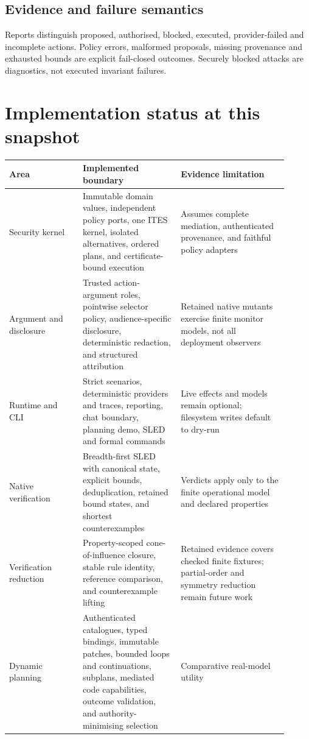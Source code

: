 \documentclass[11pt]{article}
\begin{document}
\subsection{Evidence and failure semantics}
Reports distinguish proposed, authorised, blocked, executed, provider-failed
and incomplete actions. Policy errors, malformed proposals, missing provenance
and exhausted bounds are explicit fail-closed outcomes. Securely blocked
attacks are diagnostics, not executed invariant failures.

\section{Implementation status at this snapshot}

\begin{tabular}{p{0.24\linewidth}p{0.32\linewidth}p{0.35\linewidth}}
\toprule
Area & Implemented boundary & Evidence limitation \\
\midrule
Security kernel & Immutable domain values, independent policy ports, one ITES
kernel, isolated alternatives, ordered plans, and certificate-bound execution
& Assumes complete mediation, authenticated provenance, and faithful policy
adapters \\
Argument and disclosure & Trusted action-argument roles, pointwise selector
policy, audience-specific disclosure, deterministic redaction, and structured
attribution & Retained native mutants exercise finite monitor models, not all
deployment observers \\
Runtime and CLI & Strict scenarios, deterministic providers and traces,
reporting, chat boundary, planning demo, SLED and formal commands & Live
effects and models remain optional; filesystem writes default to dry-run \\
Native verification & Breadth-first SLED with canonical state, explicit bounds,
deduplication, retained bound states, and shortest counterexamples & Verdicts
apply only to the finite operational model and declared properties \\
Verification reduction & Property-scoped cone-of-influence closure, stable rule
identity, reference comparison, and counterexample lifting & Retained evidence
covers checked finite fixtures; partial-order and symmetry reduction remain
future work \\
Dynamic planning & Authenticated catalogues, typed bindings, immutable patches,
bounded loops and continuations, subplans, mediated code capabilities, outcome
validation, and authority-minimising selection & Comparative real-model utility

\end{tabular}
\end{document}
